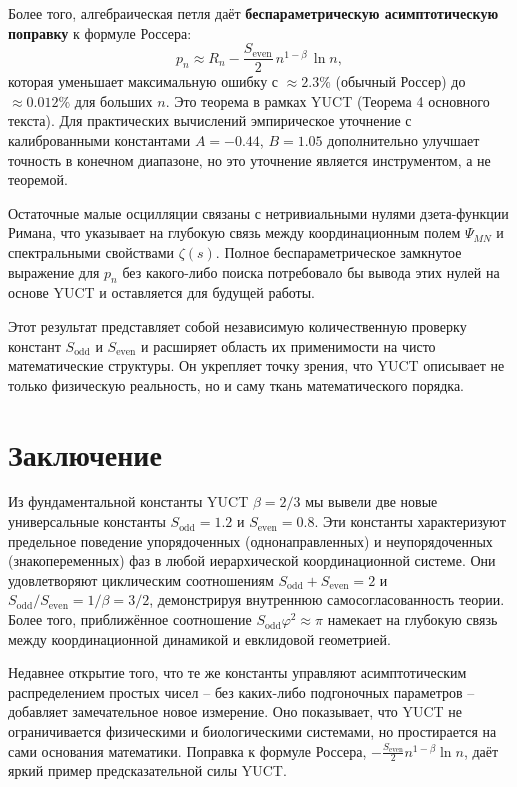 \documentclass[12pt,a4paper]{article}
\begin{document}
	Более того, алгебраическая петля даёт \textbf{беспараметрическую асимптотическую поправку} к формуле Россера:
	\[
	p_n \approx R_n - \frac{S_{\mathrm{even}}}{2}\, n^{1-\beta}\,\ln n,
	\]
	которая уменьшает максимальную ошибку с \(\approx 2.3\%\) (обычный Россер) до \(\approx 0.012\%\) для больших \(n\). Это теорема в рамках YUCT (Теорема 4 основного текста). Для практических вычислений эмпирическое уточнение с калиброванными константами \(A=-0.44\), \(B=1.05\) дополнительно улучшает точность в конечном диапазоне, но это уточнение является инструментом, а не теоремой.
	
	Остаточные малые осцилляции связаны с нетривиальными нулями дзета-функции Римана, что указывает на глубокую связь между координационным полем \(\Psi_{MN}\) и спектральными свойствами \(\zeta(s)\). Полное беспараметрическое замкнутое выражение для \(p_n\) без какого-либо поиска потребовало бы вывода этих нулей на основе YUCT и оставляется для будущей работы.
	
	Этот результат представляет собой независимую количественную проверку констант \(S_{\mathrm{odd}}\) и \(S_{\mathrm{even}}\) и расширяет область их применимости на чисто математические структуры. Он укрепляет точку зрения, что YUCT описывает не только физическую реальность, но и саму ткань математического порядка.
	
	\section{Заключение}
	Из фундаментальной константы YUCT \(\beta = 2/3\) мы вывели две новые универсальные константы \(S_{\text{odd}} = 1.2\) и \(S_{\text{even}} = 0.8\). Эти константы характеризуют предельное поведение упорядоченных (однонаправленных) и неупорядоченных (знакопеременных) фаз в любой иерархической координационной системе. Они удовлетворяют циклическим соотношениям \(S_{\text{odd}}+S_{\text{even}}=2\) и \(S_{\text{odd}}/S_{\text{even}} = 1/\beta = 3/2\), демонстрируя внутреннюю самосогласованность теории. Более того, приближённое соотношение \(S_{\text{odd}}\varphi^2 \approx \pi\) намекает на глубокую связь между координационной динамикой и евклидовой геометрией.
	
	Недавнее открытие того, что те же константы управляют асимптотическим распределением простых чисел -- без каких-либо подгоночных параметров -- добавляет замечательное новое измерение. Оно показывает, что YUCT не ограничивается физическими и биологическими системами, но простирается на сами основания математики. Поправка к формуле Россера, \(-\frac{S_{\text{even}}}{2}n^{1-\beta}\ln n\), даёт яркий пример предсказательной силы YUCT.
	
\end{document}
